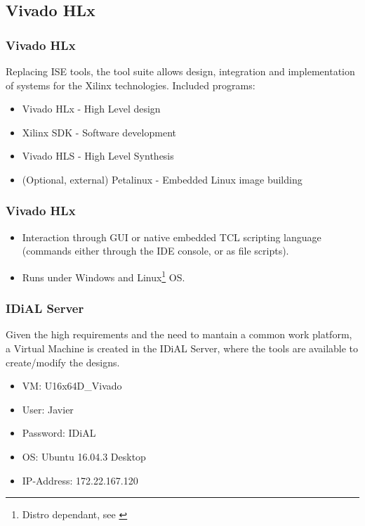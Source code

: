 
\subsection{Vivado HLx}

\begin{frame}
	\frametitle{Vivado HLx}
	Replacing ISE tools, the tool suite allows design, integration and implementation of systems for the Xilinx technologies.
	\vfill
	Included programs:
	\begin{itemize}
		\item Vivado HLx - High Level design
		\item Xilinx SDK - Software development 
		\item Vivado HLS - High Level Synthesis
		\item (Optional, external) Petalinux - Embedded Linux image building
	\end{itemize}
\end{frame}

\begin{frame}
	\frametitle{Vivado HLx}
	\begin{itemize}
		\item Interaction through GUI or native embedded TCL scripting language (commands either through the IDE console, or as file scripts). 
		\item Runs under Windows and Linux\footnote[frame]{Distro dependant, see \cite{UG973}} OS.
	\end{itemize}
\end{frame}

\begin{frame}
	\frametitle{IDiAL Server}
	Given the high requirements and the need to mantain a common work platform, a Virtual Machine is created in the IDiAL Server, where the tools are available to create/modify the designs.
	\vfill
	\begin{itemize}
		\item VM: U16x64D\_Vivado
		\item User: Javier
		\item Password: IDiAL
		\item OS: Ubuntu 16.04.3 Desktop
		\item IP-Address: 172.22.167.120
	\end{itemize}
\end{frame}

